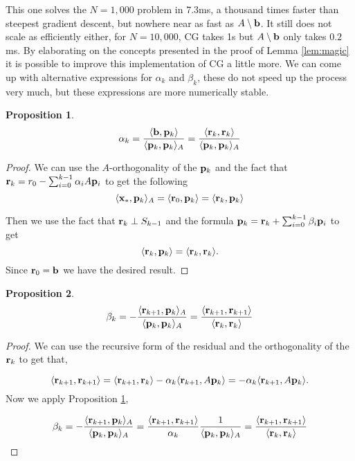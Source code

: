 \documentclass{article}
\newcommand{\bx}{{\bf x}}
\newcommand{\bb}{{\bf b}}
\newcommand{\br}{{\bf r}}
\newcommand{\bp}{{\bf p}}
\newcommand{\beq}{\begin{equation}}
\newcommand{\eeq}{\end{equation}}
\newtheorem{prop}{Proposition}[section]
\theoremstyle{remark}
\begin{document}
This one solves the $N=1,000$ problem in $7.3$ms, a thousand times faster than steepest gradient descent, but nowhere near as fast as $A \setminus \bb$. It still does not scale as efficiently either, for $N = 10,000$, CG takes 1s but $A \setminus \bb$ only takes $0.2$ms.  
By elaborating on the concepts presented in the proof of Lemma \ref{lem:magic} it is possible to improve this implementation of CG a little more. We can come up with alternative expressions for $\alpha_k$ and $\beta_k$, these do not speed up the process very much, but these expressions are more numerically stable. 
\begin{prop}
\label{prop:fastalpha}
\beq 
\alpha_k = \frac{\langle \bb , \bp_k \rangle }{\langle \bp_k, \bp_k\rangle_A} = \frac{\langle \br_k, \br_k \rangle }{\langle \bp_k, \bp_k\rangle_A} 
\eeq
\end{prop}

\begin{proof}
We can use the $A$-orthogonality of the $\bp_k$ and the fact that $\br_k = r_0 -\sum_{i=0}^{k-1} \alpha_i A\bp_i$ to get the following 
\beq
\langle \bx_*, \bp_k\rangle_A = \langle \br_0 , \bp_k\rangle = \langle \br_k, \bp_k \rangle  
\eeq

Then we use the fact that $\br_k \perp S_{k-1}$ and the formula $\bp_k = \br_k + \sum_{i=0}^{k-1} \beta_i \bp_i$ to get
\beq
\langle \br_k, \bp_k \rangle = \langle \br_k ,\br_k \rangle.
\eeq
Since $\br_0 = \bb$ we have the desired result. 
\end{proof}

\begin{prop}
\beq
\beta_k = -\frac{\langle \br_{k+1} , \bp_k \rangle_A }{\langle \bp_k, \bp_k\rangle_A} = \frac{\langle \br_{k+1}, \br_{k+1} \rangle }{\langle \br_k, \br_k\rangle} 
\eeq
\end{prop}

\begin{proof}
We can use the recursive form of the residual and the orthogonality of the $\br_k$ to get that, 

\beq
\langle \br_{k+1} , \br_{k+1 }\rangle = \langle \br_{k+1}, \br_k \rangle - \alpha_k \langle \br_{k+1}, A\bp_k \rangle =  - \alpha_k \langle \br_{k+1}, A\bp_k \rangle.
\eeq
Now we apply Proposition \ref{prop:fastalpha}, 

\beq
\beta_k = -\frac{\langle \br_{k+1} , \bp_k \rangle_A }{\langle \bp_k, \bp_k\rangle_A} = \frac{\langle \br_{k+1}, \br_{k+1} \rangle }{\alpha_k} \frac{1}{\langle \bp_k , \bp_k \rangle_A } = \frac{\langle \br_{k+1}, \br_{k+1} \rangle }{\langle \br_{k}, \br_{k} \rangle} 
\eeq
\end{proof}
\end{document}
